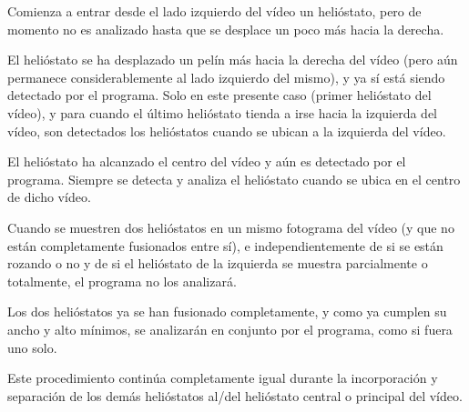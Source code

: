 \documentclass[12pt]{article}
\begin{document}
Comienza a entrar desde el lado izquierdo del vídeo un helióstato, pero de momento no es analizado hasta que se desplace un poco más hacia la derecha.




El helióstato se ha desplazado un pelín más hacia la derecha del vídeo (pero aún permanece considerablemente al lado izquierdo del mismo), y ya sí está siendo detectado por el programa. Solo en este presente caso (primer helióstato del vídeo), y para cuando el último helióstato tienda a irse hacia la izquierda del vídeo, son detectados los helióstatos cuando se ubican a la izquierda del vídeo.




El helióstato ha alcanzado el centro del vídeo y aún es detectado por el programa. Siempre se detecta y analiza el helióstato cuando se ubica en el centro de dicho vídeo.





Cuando se muestren dos helióstatos en un mismo fotograma del vídeo (y que no están completamente fusionados entre sí), e independientemente de si se están rozando o no y de si el helióstato de la izquierda se muestra parcialmente o totalmente, el programa no los analizará.




Los dos helióstatos ya se han fusionado completamente, y como ya cumplen su ancho y alto mínimos, se analizarán en conjunto por el programa, como si fuera uno solo.

Este procedimiento continúa completamente igual durante la incorporación y separación de los demás helióstatos al/del helióstato central o principal del vídeo.
\end{document}
